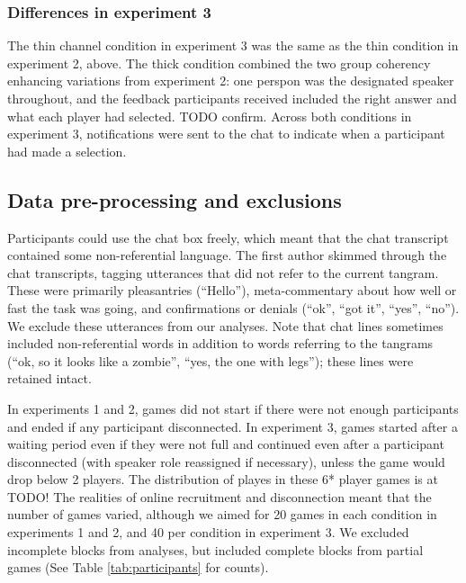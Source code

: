 \documentclass[
  english,
  a4paper,
]{article}
\begin{document}
\hypertarget{differences-in-experiment-3}{%
\subsubsection{Differences in experiment 3}\label{differences-in-experiment-3}}

The thin channel condition in experiment 3 was the same as the thin condition in experiment 2, above. The thick condition combined the two group coherency enhancing variations from experiment 2: one perspon was the designated speaker throughout, and the feedback participants received included the right answer and what each player had selected. TODO confirm. Across both conditions in experiment 3, notifications were sent to the chat to indicate when a participant had made a selection.

\hypertarget{data-pre-processing-and-exclusions}{%
\subsection{Data pre-processing and exclusions}\label{data-pre-processing-and-exclusions}}

Participants could use the chat box freely, which meant that the chat transcript contained some non-referential language. The first author skimmed through the chat transcripts, tagging utterances that did not refer to the current tangram. These were primarily pleasantries (``Hello''), meta-commentary about how well or fast the task was going, and confirmations or denials (``ok'', ``got it'', ``yes'', ``no''). We exclude these utterances from our analyses. Note that chat lines sometimes included non-referential words in addition to words referring to the tangrams (``ok, so it looks like a zombie'', ``yes, the one with legs''); these lines were retained intact.

In experiments 1 and 2, games did not start if there were not enough participants and ended if any participant disconnected. In experiment 3, games started after a waiting period even if they were not full and continued even after a participant disconnected (with speaker role reassigned if necessary), unless the game would drop below 2 players. The distribution of playes in these 6* player games is at TODO! The realities of online recruitment and disconnection meant that the number of games varied, although we aimed for 20 games in each condition in experiments 1 and 2, and 40 per condition in experiment 3. We excluded incomplete blocks from analyses, but included complete blocks from partial games (See Table \ref{tab:participants} for counts).
\end{document}
